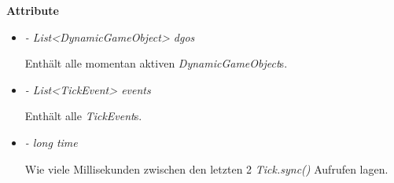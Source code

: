         \textbf{Attribute}
        \begin{itemize}
            \item \textit{- List<DynamicGameObject> dgos}
                \begin{leftbar}[0.9\linewidth]
                    Enthält alle momentan aktiven \textit{DynamicGameObject}s.
                \end{leftbar}
            \item \textit{- List<TickEvent> events}
                \begin{leftbar}[0.9\linewidth]
                    Enthält alle \textit{TickEvent}s.
                \end{leftbar}
            \item \textit{- long time}
                \begin{leftbar}[0.9\linewidth]
                    Wie viele Millisekunden zwischen den letzten 2 \textit{Tick.sync()} Aufrufen lagen.
                \end{leftbar}
        \end{itemize}

